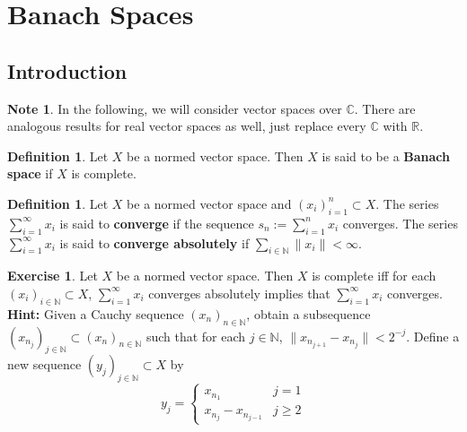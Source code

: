 \documentclass[12pt]{amsart}
\theoremstyle{definition}
\newtheorem{defn}[definition]{Definition}
\newtheorem{note}[definition]{Note}
\newtheorem{ex}[definition]{Exercise}
\newcommand{\C}{\mathbb{C}}
\newcommand{\N}{\mathbb{N}}
\newcommand{\R}{\mathbb{R}}
\newcommand{\tbf}[1]{\textbf{#1}}
\newcommand{\seq}[2]{(#1_{#2})_{#2 \in \N}}
\DeclareMathOperator*{\0}{\mbf{0}}
\DeclareMathOperator*{\1}{\mbf{1}}
\newcommand{\lex}[1]{\label{ex:#1}}
\newcommand{\ld}[1]{\label{defn:#1}}
\begin{document}
 

	
	
	
	
	
	
	
	




	
	
	
	
	
	
	
	
	
	
	
	
	
	
	\newpage
	\section{Banach Spaces}
	\subsection{Introduction}
	\begin{note}
		In the following, we will consider vector spaces over $\C$. There are analogous results for real vector spaces as well, just replace every $\C$ with $\R$.
	\end{note}
	
	\begin{defn} \ld{}
		Let $X$ be a normed vector space. Then $X$ is said to be a \tbf{Banach space} if $X$ is complete.  
	\end{defn}
	
	\begin{defn} \ld{}
		Let $X$ be a normed vector space and $(x_i)_{i=1}^n \subset X$. The series $\sum_{i =1}^{\infty}x_i$ is said to \tbf{converge} if the sequence $s_n := \sum_{i=1}^n x_i$ converges. The series $\sum_{i =1}^{\infty}x_i$ is said to \tbf{converge absolutely} if $\sum_{i\in \N}\|x_i \|< \infty$.
	\end{defn}
	
	\begin{ex} \lex{}
		Let $X$ be a normed vector space. Then $X$ is complete iff for each $\seq{x}{i} \subset X$, $\sum_{i =1}^{\infty}x_i$ converges absolutely implies that $\sum_{i=1}^{\infty}x_i$ converges. \\
		\tbf{Hint:} Given a Cauchy sequence $(x_n)_{n \in \N}$, obtain a subsequence $(x_{n_j})_{j \in \N} \subset (x_n)_{n \in \N}$ such that for each $j \in \N$, $\|x_{n_{j+1}} - x_{n_{j}}\| < 2^{-j}$. Define a new sequence $(y_j)_{j \in \N} \subset X$ by 
		\[
		y_j = 
		\begin{cases}
		x_{n_1} & j =1 \\  
		x_{n_j} - x_{n_{j-1}} & j \geq 2	
		\end{cases}
		\] 
	\end{ex}
	
\end{document}
